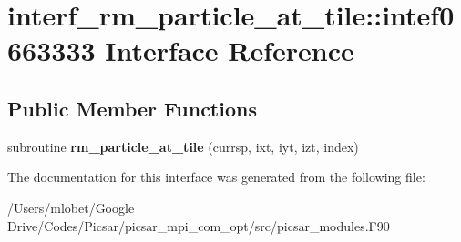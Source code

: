 \hypertarget{interfaceinterf__rm__particle__at__tile_1_1intef0663333}{}\section{interf\+\_\+rm\+\_\+particle\+\_\+at\+\_\+tile\+:\+:intef0663333 Interface Reference}
\label{interfaceinterf__rm__particle__at__tile_1_1intef0663333}
\subsection*{Public Member Functions}
\begin{DoxyCompactItemize}
\item 
subroutine {\bfseries rm\+\_\+particle\+\_\+at\+\_\+tile} (currsp, ixt, iyt, izt, index)\hypertarget{interfaceinterf__rm__particle__at__tile_1_1intef0663333_aabb5fe26b7701fc1af22ac2a4d3e4d76}{}\label{interfaceinterf__rm__particle__at__tile_1_1intef0663333_aabb5fe26b7701fc1af22ac2a4d3e4d76}

\end{DoxyCompactItemize}


The documentation for this interface was generated from the following file\+:\begin{DoxyCompactItemize}
\item 
/\+Users/mlobet/\+Google Drive/\+Codes/\+Picsar/picsar\+\_\+mpi\+\_\+com\+\_\+opt/src/picsar\+\_\+modules.\+F90\end{DoxyCompactItemize}

